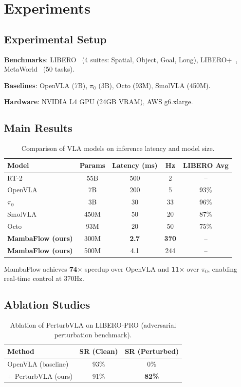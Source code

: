 \documentclass[11pt]{article}
\begin{document}
\section{Experiments}

\subsection{Experimental Setup}

\textbf{Benchmarks}: LIBERO~\cite{libero2023} (4 suites: Spatial, Object, Goal, Long), LIBERO+~\cite{liberoplus2025}, MetaWorld~\cite{metaworld2020} (50 tasks).

\textbf{Baselines}: OpenVLA (7B), $\pi_0$ (3B), Octo (93M), SmolVLA (450M).

\textbf{Hardware}: NVIDIA L4 GPU (24GB VRAM), AWS g6.xlarge.

\subsection{Main Results}

\begin{table}[h]
\centering
\caption{Comparison of VLA models on inference latency and model size.}
\label{tab:main}
\begin{tabular}{lcccc}
\toprule
Model & Params & Latency (ms) & Hz & LIBERO Avg \\
\midrule
RT-2 & 55B & 500 & 2 & -- \\
OpenVLA & 7B & 200 & 5 & 93\% \\
$\pi_0$ & 3B & 30 & 33 & 96\% \\
SmolVLA & 450M & 50 & 20 & 87\% \\
Octo & 93M & 20 & 50 & 75\% \\
\midrule
\textbf{MambaFlow (ours)} & 300M & \textbf{2.7} & \textbf{370} & -- \\
\textbf{MambaFlow (ours)} & 500M & 4.1 & 244 & -- \\
\bottomrule
\end{tabular}
\end{table}

MambaFlow achieves \textbf{74$\times$} speedup over OpenVLA and \textbf{11$\times$} over $\pi_0$, enabling real-time control at 370Hz.

\subsection{Ablation Studies}

\begin{table}[h]
\centering
\caption{Ablation of PerturbVLA on LIBERO-PRO (adversarial perturbation benchmark).}
\label{tab:perturb}
\begin{tabular}{lcc}
\toprule
Method & SR (Clean) & SR (Perturbed) \\
\midrule
OpenVLA (baseline) & 93\% & 0\% \\
+ PerturbVLA (ours) & 91\% & \textbf{82\%} \\
\bottomrule
\end{tabular}
\end{table}
\end{document}
